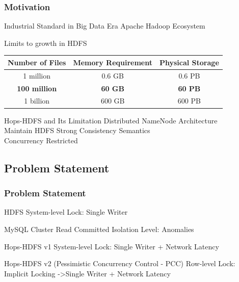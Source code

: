 \documentclass{beamer}
\begin{document}
\begin{frame}
\frametitle{Motivation}
\begin{block}{Industrial Standard in Big Data Era}
	Apache Hadoop Ecosystem
\end{block}

\begin{block}{Limits to growth in HDFS}
	\begin{table}[ht]
		\centering
		\begin{tabular}{|c|c|c|}
			\hline
			\textbf{Number of Files} & \textbf{Memory Requirement} & \textbf{Physical Storage} \\ \hline
			1 million       & 0.6 GB             & 0.6 PB           \\ \hline
			{\color{red}\textbf{100 million}}     & {\color{red}\textbf{60 GB}}              & {\color{red}\textbf{60 PB}}            \\ \hline
			1 billion       & 600 GB             & 600 PB           \\ \hline
		\end{tabular}
	\end{table}
\end{block}

\begin{block}{Hops-HDFS and Its Limitation}
	Distributed NameNode Architecture \\ Maintain HDFS Strong Consistency Semantics \\ Concurrency Restricted
\end{block}
\end{frame}

\subsection{Problem Statement}
\begin{frame}
\frametitle{Problem Statement}
\begin{block}{HDFS}
	System-level Lock: Single Writer
\end{block}
\begin{block}{MySQL Cluster}
	Read Committed Isolation Level: Anomalies
\end{block}
\begin{block}{Hops-HDFS v1}
	System-level Lock: Single Writer + Network Latency
\end{block}
\begin{block}{Hops-HDFS v2 (Pessimistic Concurrency Control - PCC)}
	Row-level Lock: Implicit Locking -\textgreater Single Writer + Network Latency
\end{block}

\end{frame}
\end{document}
